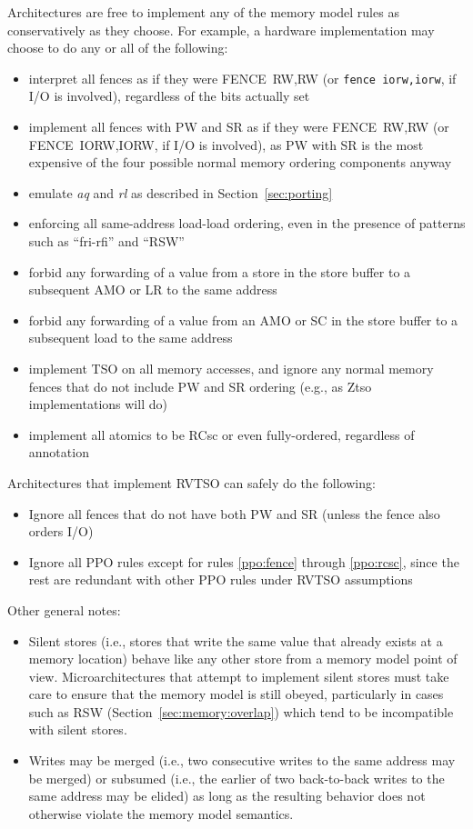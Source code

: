 Architectures are free to implement any of the memory model rules as conservatively as they choose.  For example, a hardware implementation may choose to do any or all of the following:
  \begin{itemize}
    \item interpret all fences as if they were FENCE~RW,RW (or {\tt fence iorw,iorw}, if I/O is involved), regardless of the bits actually set
    \item implement all fences with PW and SR as if they were FENCE~RW,RW (or FENCE~IORW,IORW, if I/O is involved), as PW with SR is the most expensive of the four possible normal memory ordering components anyway
    \item emulate {\em aq} and {\em rl} as described in Section~\ref{sec:porting}
    \item enforcing all same-address load-load ordering, even in the presence of patterns such as ``fri-rfi'' and ``RSW''
    \item forbid any forwarding of a value from a store in the store buffer to a subsequent AMO or LR to the same address
    \item forbid any forwarding of a value from an AMO or SC in the store buffer to a subsequent load to the same address
    \item implement TSO on all memory accesses, and ignore any normal memory fences that do not include PW and SR ordering (e.g., as Ztso implementations will do)
    \item implement all atomics to be RCsc or even fully-ordered, regardless of annotation
  \end{itemize}

Architectures that implement RVTSO can safely do the following:
\begin{itemize}
  \item Ignore all fences that do not have both PW and SR (unless the fence also orders I/O)
  \item Ignore all PPO rules except for rules \ref{ppo:fence} through \ref{ppo:rcsc}, since the rest are redundant with other PPO rules under RVTSO assumptions
\end{itemize}

Other general notes:

\begin{itemize}
  \item Silent stores (i.e., stores that write the same value that already exists at a memory location) behave like any other store from a memory model point of view.  Microarchitectures that attempt to implement silent stores must take care to ensure that the memory model is still obeyed, particularly in cases such as RSW (Section~\ref{sec:memory:overlap}) which tend to be incompatible with silent stores.
  \item Writes may be merged (i.e., two consecutive writes to the same address may be merged) or subsumed (i.e., the earlier of two back-to-back writes to the same address may be elided) as long as the resulting behavior does not otherwise violate the memory model semantics.
\end{itemize}

